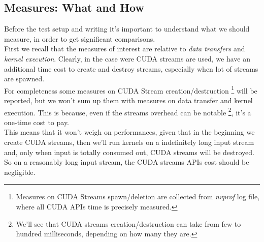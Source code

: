 \subsection{Measures: What and How}
Before the test setup and writing it's important to understand what we should measure, in order to get significant comparisons.\\
First we recall that the measures of interest are relative to \textit{data transfers} and \textit{kernel execution}. Clearly, in the case were CUDA streams are used, we have an additional time cost to create and destroy streams, especially when lot of streams are spawned.\\
For completeness some measures on CUDA Stream creation/destruction \footnote{Measures on CUDA Streams spawn/deletion are collected from \textit{nvprof} log file, where all CUDA APIs time is precisely measured.} will be reported, but we won't sum up them with measures on data transfer and kernel execution. This is because, even if the streams overhead can be notable \footnote{We'll see that CUDA streams creation/destruction can take from few to hundred milliseconds, depending on how many they are.}, it's a one-time cost to pay.\\
This means that it won't weigh on performances, given that in the beginning we create CUDA streams, then we'll run kernels on a indefinitely long input stream and, only when input is totally consumed out, CUDA streams will be destroyed. 
So on a reasonably long input stream, the CUDA streams APIs cost should be negligible.

